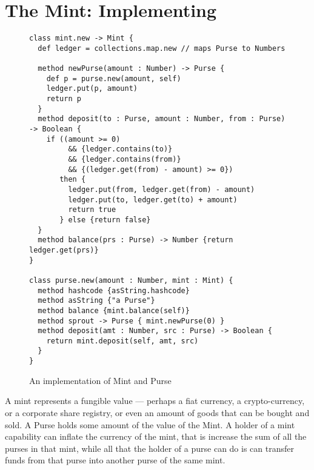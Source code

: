 \section{The Mint: Implementing }


\begin{figure}
\begin{lstlisting}
class mint.new -> Mint {
  def ledger = collections.map.new // maps Purse to Numbers

  method newPurse(amount : Number) -> Purse {
    def p = purse.new(amount, self)
    ledger.put(p, amount)
    return p
  }
  method deposit(to : Purse, amount : Number, from : Purse) -> Boolean { 
    if ((amount >= 0)
         && {ledger.contains(to)}
         && {ledger.contains(from)}
         && {(ledger.get(from) - amount) >= 0})
       then {
         ledger.put(from, ledger.get(from) - amount)
         ledger.put(to, ledger.get(to) + amount)
         return true
       } else {return false}
  }
  method balance(prs : Purse) -> Number {return ledger.get(prs)}
}

class purse.new(amount : Number, mint : Mint) {
  method hashcode {asString.hashcode}
  method asString {"a Purse"}
  method balance {mint.balance(self)}
  method sprout -> Purse { mint.newPurse(0) }
  method deposit(amt : Number, src : Purse) -> Boolean {
    return mint.deposit(self, amt, src)
  }
}
\end{lstlisting}
\caption{An implementation of Mint and Purse}
\label{fig:ledger}
\end{figure}




A mint represents a fungible value --- perhaps a fiat currency, a
crypto-currency, or a corporate share registry, or even an amount of
goods that can be bought and sold.  A Purse holds some amount of the
value of the Mint. A holder of a mint capability can inflate the
currency of the mint, that is increase the sum of all the purses in
that mint, while all that the holder of a purse can do is can transfer
funds from that purse into another purse of the same mint.

